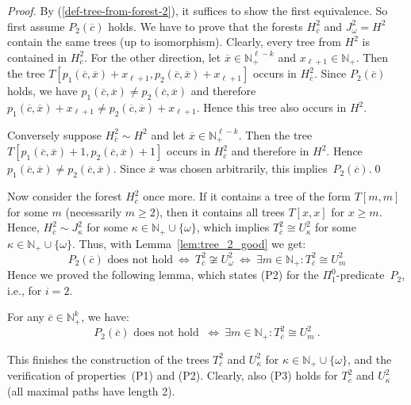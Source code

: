 \documentclass[envcountsame]{llncs}
\newcommand{\N}{\mathbb N}
\begin{document}
\begin{proof}
  By (\ref{def-tree-from-forest-2}),
  it suffices to show the first equivalence. So first
  assume $P_2(\overline c)$ holds. We have to prove that the forests
  $H^2_{\overline c}$ and $J^2_\omega = H^2$ contain the same trees (up to
  isomorphism). Clearly, every tree from $H^2$ is contained in $H^2_{\overline c}$.
  For the other direction, let $\overline x\in\N_+^{\ell-k}$ and
  $x_{\ell+1}\in\N_+$. Then the tree $T[p_1(\overline c,\overline
  x)+x_{\ell+1},p_2(\overline c,\overline x)+x_{\ell+1}]$ occurs in
  $H^2_{\overline c}$. Since $P_2(\overline c)$ holds, we have
  $p_1(\overline c,\overline x)\neq p_2(\overline c,\overline x)$ and
  therefore $p_1(\overline c,\overline x)+x_{\ell+1}\neq p_2(\overline
  c,\overline x)+x_{\ell+1}$. Hence this tree also occurs in
  $H^2$.

  Conversely suppose $H^2_{\overline c}\sim H^2$ and let
  $\overline x\in\N_+^{\ell-k}$. Then the tree $T[p_1(\overline
  c,\overline x)+1,p_2(\overline c,\overline x)+1]$ occurs in
  $H^2_{\overline c}$ and therefore in $H^2$. Hence
  $p_1(\overline c,\overline x)\neq p_2(\overline c,\overline
  x)$. Since $\overline x$ was chosen arbitrarily, this
  implies~$P_2(\overline c)$.\qed
\end{proof}
Now consider the forest $H^2_{\overline c}$ once more.
If it contains a tree of the form $T[m,m]$ for some $m$ 
(necessarily $m \geq 2$), then it contains all 
trees $T[x,x]$ for $x\geq m$. Hence, $H^2_{\overline{c}} \sim 
J^2_\kappa$ for some $\kappa \in
\mathbb{N}_+ \cup \{\omega\}$, which implies
$T^2_{\overline{c}} \cong  U^2_\kappa$ for some $\kappa \in
\mathbb{N}_+ \cup \{\omega\}$.
Thus, with Lemma~\ref{lem:tree_2_good} we get:
$$
  P_2(\overline c)\text{ does not hold} \ \iff \
  T^2_{\overline{c}} \not\cong U^2_\omega \ \iff \
  \exists m \in \mathbb{N}_+ :  T^2_{\overline{c}} \cong U^2_m
$$
Hence we proved the following lemma, which states
(P2) for the $\Pi^0_1$-predicate~$P_2$, i.e., for $i=2$.

\begin{lemma}\label{lem:tree_2_bad}
  For any $\overline c\in \N_+^k$, we have:
  $$
  P_2(\overline c) \text{ does not hold } \  \iff  \
     \exists m \in \N_+ : T^2_{\overline{c}} \cong U^2_m \ .
  $$
\end{lemma}
This finishes the construction of the trees $T^2_{\overline c}$ and
$U^2_\kappa$ for $\kappa\in\N_+\cup\{\omega\}$, and the verification
of properties~(P1) and (P2).
Clearly, also (P3) holds for $T^2_{\overline c}$ and
$U^2_\kappa$ (all maximal paths have length 2).
\end{document}
